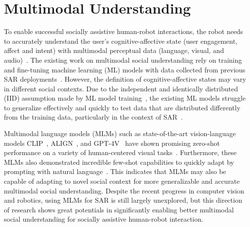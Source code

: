 \documentclass[
twocolumn,
]{ceurart}
\begin{document}


\section{Multimodal Understanding}

To enable successful socially assistive human-robot interactions, the robot needs to accurately understand the user's cognitive-affective state (user engagement, affect and intent) with multimodal perceptual data (language, visual, and audio)~\cite{youssef2022survey}. The existing work on multimodal social understanding rely on training and fine-tuning machine learning (ML) models with data collected from previous SAR deployments~\cite{robinson2023robotic}. However, the definition of cognitive-affective states may vary in different social contexts. Due to the independent and identically distributed (IID) assumption made by ML model training~\cite{wang2022generalizing}, the existing ML models struggle to generalize effectively and quickly to test data that are distributed differently from the training data, particularly in the context of SAR~\cite{shi2022toward}.

Multimodal language models (MLMs) such as state-of-the-art vision-language models CLIP~\cite{radford2021learning}, ALIGN~\cite{jia2021scaling}, and GPT-4V~\cite{achiam2023gpt} have shown promising zero-shot performance on a variety of human-centered visual tasks~\cite{zhang2023vision, wu2023gpt4vis}. Furthermore, these MLMs also demonstrated incredible few-shot capabilities to quickly adapt by prompting with natural language~\cite{ge2023mllm}. This indicates that MLMs may also be capable of adapting to novel social context for more generalizable and accurate multimodal social understanding. Despite the recent progress in computer vision and robotics, using MLMs for SAR is still largely unexplored, but this direction of research shows great potentials in significantly enabling better multimodal social understanding for socially assistive human-robot interaction.
\end{document}
